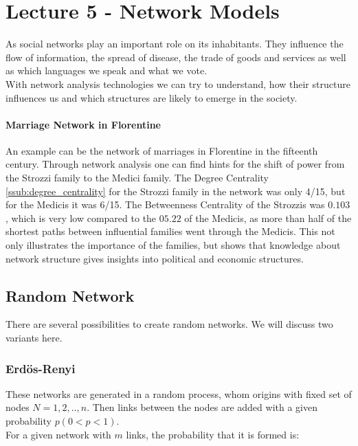 \section{Lecture 5 - Network Models} %
\label{sec:lecture_5_network_models}
As social networks play an important role on its inhabitants.
They influence the flow of information,
the spread of disease,
the trade of goods and services as well as which languages we speak and what we vote.\\
With network analysis technologies we can try to understand,
how their structure influences us
and which structures are likely to emerge in the society.

\paragraph{Marriage Network in Florentine} %
\label{par:marriage_network_in_florentine}
	An example can be the network of marriages in Florentine in the fifteenth century.
	Through network analysis one can find hints for the shift of power from the 
	Strozzi family to the Medici family.
	The Degree Centrality \ref{ssub:degree_centrality} for the Strozzi family in the network
	was only 4/15, but for the Medicis it was 6/15.
	The Betweenness Centrality of the Strozzis was $0.103$,
	which is very low compared to the $05.22$ of the Medicis,
	as more than half of the shortest paths between influential families went through the Medicis.
	This not only illustrates the importance of the families,
	but shows that knowledge about network structure gives insights into political and economic structures.

\subsection{Random Network} %
\label{sub:random_network}
There are several possibilities to create random networks.
We will discuss two variants here.

\subsubsection{Erd\"os-Renyi\\} %
\label{ssub:erdoes-renyi}
These networks are generated in a random process,
whom origins with fixed set of nodes $N = {1,2,..,n}$.
Then links between the nodes are added with a given probability $p (0 < p < 1)$.\\
For a given network with $m$ links,
the probability that it is formed is:

